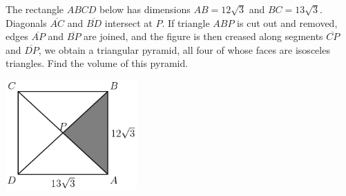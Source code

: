 The rectangle $ABCD$ below has dimensions $AB = 12 \sqrt{3}$ and $BC = 13 \sqrt{3}$.  Diagonals $\overline{AC}$ and $\overline{BD}$ intersect at $P$.  If triangle $ABP$ is cut out and removed, edges $\overline{AP}$ and $\overline{BP}$ are joined, and the figure is then creased along segments $\overline{CP}$ and $\overline{DP}$, we obtain a triangular pyramid, all four of whose faces are isosceles triangles.  Find the volume of this pyramid.

\begin{center}
\includegraphics[width = 50.400000000000006mm]{img/fig0.png}
\end{center}